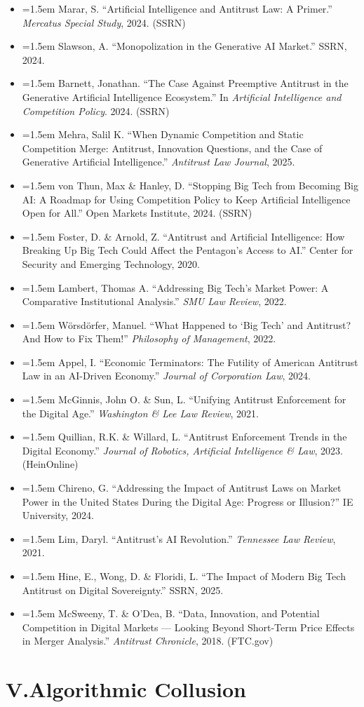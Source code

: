 \documentclass[12pt, letterpaper]{article}
\newcommand{\entry}[1]{%
  \item \hangindent=1.5em \hangafter=1 #1%
}
\begin{document}
\begin{itemize}
\entry{Marar, S. ``Artificial Intelligence and Antitrust Law: A Primer.'' \textit{Mercatus Special Study}, 2024. (SSRN)}
\entry{Slawson, A. ``Monopolization in the Generative AI Market.'' SSRN, 2024.}
\entry{Barnett, Jonathan. ``The Case Against Preemptive Antitrust in the Generative Artificial Intelligence Ecosystem.'' In \textit{Artificial Intelligence and Competition Policy}. 2024. (SSRN)}
\entry{Mehra, Salil K. ``When Dynamic Competition and Static Competition Merge: Antitrust, Innovation Questions, and the Case of Generative Artificial Intelligence.'' \textit{Antitrust Law Journal}, 2025.}
\entry{von Thun, Max \& Hanley, D. ``Stopping Big Tech from Becoming Big AI: A Roadmap for Using Competition Policy to Keep Artificial Intelligence Open for All.'' Open Markets Institute, 2024. (SSRN)}
\entry{Foster, D. \& Arnold, Z. ``Antitrust and Artificial Intelligence: How Breaking Up Big Tech Could Affect the Pentagon's Access to AI.'' Center for Security and Emerging Technology, 2020.}
\entry{Lambert, Thomas A. ``Addressing Big Tech's Market Power: A Comparative Institutional Analysis.'' \textit{SMU Law Review}, 2022.}
\entry{Wörsdörfer, Manuel. ``What Happened to `Big Tech' and Antitrust? And How to Fix Them!'' \textit{Philosophy of Management}, 2022.}
\entry{Appel, I. ``Economic Terminators: The Futility of American Antitrust Law in an AI-Driven Economy.'' \textit{Journal of Corporation Law}, 2024.}
\entry{McGinnis, John O. \& Sun, L. ``Unifying Antitrust Enforcement for the Digital Age.'' \textit{Washington \& Lee Law Review}, 2021.}
\entry{Quillian, R.K. \& Willard, L. ``Antitrust Enforcement Trends in the Digital Economy.'' \textit{Journal of Robotics, Artificial Intelligence \& Law}, 2023. (HeinOnline)}
\entry{Chireno, G. ``Addressing the Impact of Antitrust Laws on Market Power in the United States During the Digital Age: Progress or Illusion?'' IE University, 2024.}
\entry{Lim, Daryl. ``Antitrust's AI Revolution.'' \textit{Tennessee Law Review}, 2021.}
\entry{Hine, E., Wong, D. \& Floridi, L. ``The Impact of Modern Big Tech Antitrust on Digital Sovereignty.'' SSRN, 2025.}
\entry{McSweeny, T. \& O'Dea, B. ``Data, Innovation, and Potential Competition in Digital Markets --- Looking Beyond Short-Term Price Effects in Merger Analysis.'' \textit{Antitrust Chronicle}, 2018. (FTC.gov)}
\end{itemize}

\section{V.\quad Algorithmic Collusion}
\end{document}
